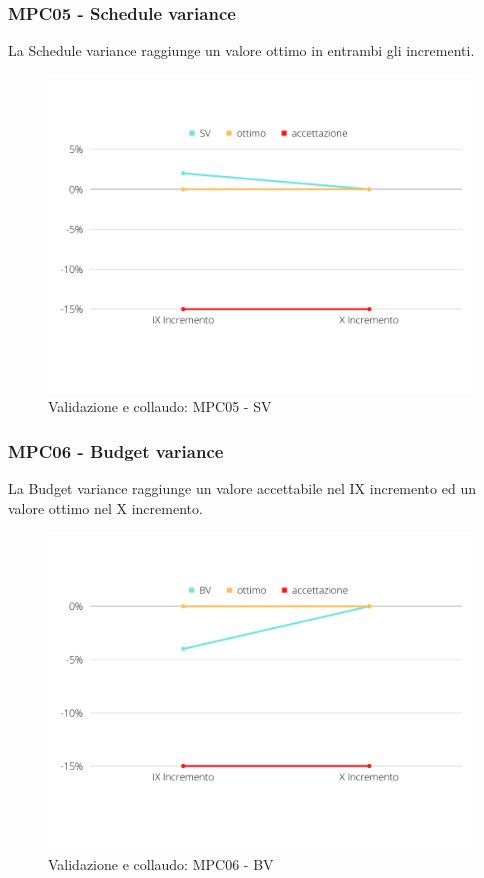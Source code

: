 \subsubsection{MPC05 - Schedule variance}
La Schedule variance raggiunge un valore ottimo in entrambi gli incrementi.
\begin{figure}[H]
    \centering
    \includegraphics[scale=0.50]{Sezioni/images/vc-SV.png}
    \caption{Validazione e collaudo: MPC05 - SV}
\end{figure}

\subsubsection{MPC06 - Budget variance}
La Budget variance raggiunge un valore accettabile nel IX incremento ed un valore ottimo nel X incremento.
\begin{figure}[H]
    \centering
    \includegraphics[scale=0.50]{Sezioni/images/vc-BV.png}
    \caption{Validazione e collaudo: MPC06 - BV}
\end{figure}